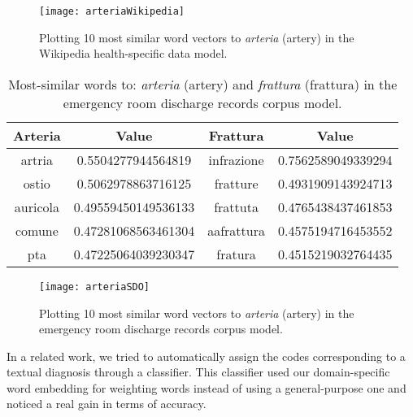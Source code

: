 \begin{figure}[ht]
	\centering
	\texttt{[image: arteriaWikipedia]}
	\caption[Artery - 10 most similar words plotted for Wikipedia health-specific model]{Plotting 10 most similar word vectors to \textit{arteria} (artery) in the Wikipedia health-specific data model.}
	\label{fig:arteriaWikipediaSpecific}
\end{figure}

\begin{table}[h!]
	\begin{center}
		\caption[Domain Specific - Most similar words in emergency room discharge records corpus model]{Most-similar words to: \textit{arteria} (artery) and \textit{frattura} (frattura) in the emergency room discharge records corpus model.}
		\label{tab:tableSDO}
		\begin{tabular}{c|S|c|S}
			\toprule
			\textbf{Arteria} & \textbf{Value} & \textbf{Frattura} & \textbf{Value} \\
			\midrule
			artria & 0.5504277944564819 & infrazione & 0.7562589049339294 \\
			ostio & 0.5062978863716125 & fratture & 0.4931909143924713 \\
			auricola & 0.49559450149536133 & frattuta & 0.4765438437461853 \\
			comune & 0.47281068563461304 & aafrattura & 0.4575194716453552 \\
			pta & 0.47225064039230347 & fratura & 0.4515219032764435 \\
			\bottomrule
		\end{tabular}
	\end{center}
\end{table}

\begin{figure}[ht]
	\centering
	\texttt{[image: arteriaSDO]}
	\caption[Artery - 10 most similar words plotted for Emergency room discharge records model]{Plotting 10 most similar word vectors to \textit{arteria} (artery) in the emergency room discharge records corpus model.}
	\label{fig:arteriaSDO}
\end{figure}



In a related work, we tried to automatically assign the codes corresponding to a textual diagnosis through a classifier. This classifier used our domain-specific word embedding for weighting words instead of using a general-purpose one and noticed a real gain in terms of accuracy.


